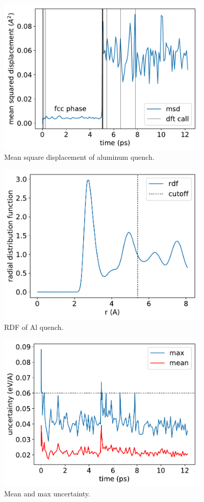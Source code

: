 \documentclass[%
superscriptaddress,
preprint,
amsmath,amssymb,
aps,
prl,
]{revtex4-1}
\begin{document}
\maketitle


\begin{figure}
	\centering
	\includegraphics[width=4in]{melt_msd.pdf}
	\caption{Mean square displacement of aluminum quench.}
\end{figure}

\begin{figure}
	\centering
	\includegraphics[width=4in]{rdf.pdf}
	\caption{RDF of Al quench.}
\end{figure}

\begin{figure}
	\centering
	\includegraphics[width=4in]{uncertainty.pdf}
	\caption{Mean and max uncertainty.}
\end{figure}
\end{document}
